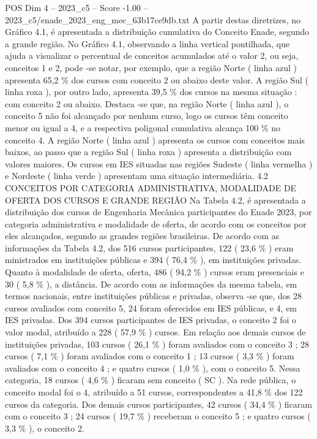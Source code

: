 \begin{textsample}{POS Dim 4 – 2023\_c5 – Score -1.00 – 2023\_c5/enade\_2023\_eng\_mec\_63b17ce9db.txt}
A partir destas diretrizes, no Gráfico 4.1, é apresentada a distribuição cumulativa do Conceito Enade, segundo a grande região.
No Gráfico 4.1, observando a linha vertical pontilhada, que ajuda a visualizar o percentual de conceitos acumulados até o valor 2, ou seja, conceitos 1 e 2, pode -se notar, por exemplo, que a região Norte ( linha azul ) apresenta 65,2 \% dos cursos com conceito 2 ou abaixo deste valor.
A região Sul ( linha roxa ), por outro lado, apresenta 39,5 \% dos cursos na mesma situação : com conceito 2 ou abaixo.
Destaca -se que, na região Norte ( linha azul ), o conceito 5 não foi alcançado por nenhum curso, logo os cursos têm conceito menor ou igual a 4, e a respectiva poligonal cumulativa alcança 100 \% no conceito 4.
A região Norte ( linha azul ) apresenta os cursos com conceitos mais baixos, ao passo que a região Sul ( linha roxa ) apresenta a distribuição com valores maiores.
Os cursos em IES situadas nas regiões Sudeste ( linha vermelha ) e Nordeste ( linha verde ) apresentam uma situação intermediária. 4.2 CONCEITOS POR CATEGORIA ADMINISTRATIVA, MODALIDADE DE OFERTA DOS CURSOS E GRANDE REGIÃO Na Tabela 4.2, é apresentada a distribuição dos cursos de Engenharia Mecânica participantes do Enade 2023, por categoria administrativa e modalidade de oferta, de acordo com os conceitos por eles alcançados, segundo as grandes regiões brasileiras.
De acordo com as informações da Tabela 4.2, dos 516 cursos participantes, 122 ( 23,6 \% ) eram ministrados em instituições públicas e 394 ( 76,4 \% ), em instituições privadas.
Quanto à modalidade de oferta, oferta, 486 ( 94,2 \% ) cursos eram presenciais e 30 ( 5,8 \% ), a distância.
De acordo com as informações da mesma tabela, em termos nacionais, entre instituições públicas e privadas, observa -se que, dos 28 cursos avaliados com conceito 5, 24 foram oferecidos em IES públicas, e 4, em IES privadas.
Dos 394 cursos participantes de IES privadas, o conceito 2 foi o valor modal, atribuído a 228 ( 57,9 \% ) cursos.
Em relação aos demais cursos de instituições privadas, 103 cursos ( 26,1 \% ) foram avaliados com o conceito 3 ; 28 cursos ( 7,1 \% ) foram avaliados com o conceito 1 ; 13 cursos ( 3,3 \% ) foram avaliados com o conceito 4 ; e quatro cursos ( 1,0 \% ), com o conceito 5.
Nessa categoria, 18 cursos ( 4,6 \% ) ficaram sem conceito ( SC ).
Na rede pública, o conceito modal foi o 4, atribuído a 51 cursos, correspondentes a 41,8 \% dos 122 cursos da categoria.
Dos demais cursos participantes, 42 cursos ( 34,4 \% ) ficaram com o conceito 3 ; 24 cursos ( 19,7 \% ) receberam o conceito 5 ; e quatro cursos ( 3,3 \% ), o conceito 2.

\end{textsample}
